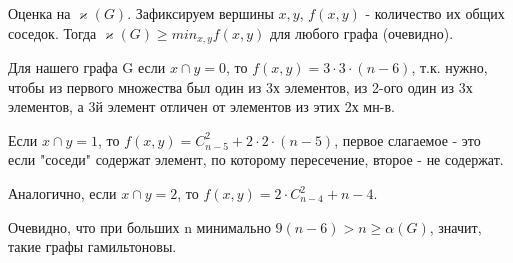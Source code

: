 Оценка на $\varkappa(G)$. Зафиксируем вершины $x, y$, $f(x, y)$ - количество их общих соседок. Тогда $\varkappa(G) \geqslant min_{x, y} f(x, y)$ для любого графа (очевидно). 

Для нашего графа G если $x \cap y = 0$, то $f(x, y) = 3 \cdot 3 \cdot (n - 6)$, т.к. нужно, чтобы из первого множества был один из 3х элементов, из 2-ого один из 3х элементов, а 3й элемент отличен от элементов из этих 2х мн-в.

Если $x \cap y = 1$, то $f(x, y) = C_{n-5}^2 + 2 \cdot 2 \cdot (n - 5)$, первое слагаемое - это если "соседи" содержат элемент, по которому пересечение, второе - не содержат.

Аналогично, если $x \cap y = 2$, то $f(x, y) = 2 \cdot C_{n-4}^2 + n - 4$.

Очевидно, что при больших n минимально $9(n-6) > n \geq \alpha(G)$, значит, такие графы гамильтоновы.
